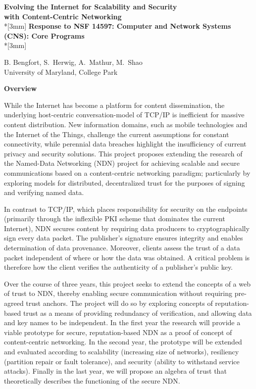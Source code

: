 \documentclass{proposalnsf}
\begin{document}
\begin{center}
{\Large{\bf Evolving the Internet for Scalability and Security \\
with Content-Centric Networking}}\\*[3mm]
{\bf Response to NSF 14597: Computer and Network Systems (CNS): Core Programs} \\*[3mm]

B. Bengfort, S.\ Herwig, A.\ Mathur, M.\ Shao\\
University of Maryland, College Park

\end{center}

\noindent
{\large{\bf Overview}}

\noindent
While the Internet has become a platform for content dissemination, the underlying host-centric conversation-model of TCP/IP is inefficient for massive content distribution. New information domains, such as mobile technologies and the Internet of the Things, challenge the current assumptions for constant connectivity, while perennial data breaches highlight the insufficiency of current privacy and security solutions. This project proposes extending the research of the Named-Data Networking (NDN) project for achieving scalable and secure communications based on a content-centric networking paradigm; particularly by exploring models for distributed, decentralized trust for the purposes of signing and verifying named data.

In contrast to TCP/IP, which places responsibility for security on the endpoints (primarily through the inflexible PKI scheme that dominates the current Internet), NDN secures content by requiring data producers to cryptographically sign every data packet. The publisher's signature ensures integrity and enables determination of data provenance. Moreover, clients assess the trust of a data packet independent of where or how the data was obtained. A critical problem is therefore how the client verifies the authenticity of a publisher's public key.

Over the course of three years, this project seeks to extend the concepts of a web of trust to NDN, thereby enabling secure communication without requiring pre-agreed trust anchors. The project will do so by exploring concepts of reputation-based trust as a means of providing redundancy of verification, and allowing data and key names to be independent. In the first year the research will provide a viable prototype for secure, reputation-based NDN as a proof of concept of content-centric networking. In the second year, the prototype will be extended and evaluated according to scalability (increasing size of networks), resiliency (partition repair or fault tolerance), and security (ability to withstand service attacks). Finally in the last year, we will propose an algebra of trust that theoretically describes the functioning of the secure NDN.
\end{document}
